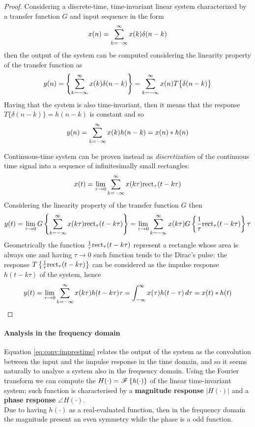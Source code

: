 	\begin{proof}
		Considering a discrete-time, time-invariant linear system characterized by a transfer function $G$ and input sequence in the form
		\[ x(n) = \sum_{k=-\infty}^\infty x(k) \delta(n-k) \]
		then the output of the system can be computed considering the linearity property of the transfer function as
		\[ y(n) = \left\{ \sum_{k=-\infty}^\infty x(k) \delta(n-k) \right\} = \sum_{k=-\infty}^\infty x(n) T\big\{ \delta(n-k) \big\} \]
		Having that the system is also time-invariant, then it means that the response $T\{\delta(n-k)\} = h(n-k)$ is constant and so 
		\[ y(n) = \sum_{k=-\infty}^\infty x(k) h(n-k) = x(n) * h(n) \]	
		
		Continuous-time system can be proven instead as \textit{discretization} of the continuous time signal into a sequence of infinitesimally small rectangles:
		\[ x(t) = \lim_{\tau\rightarrow0} \sum_{k=-\infty}^\infty x(k\tau) \textrm{rect}_\tau(t-k\tau) \]	
		Considering the linearity property of the transfer function $G$ then
		\[ y(t) = \lim_{\tau\rightarrow0} G\left\{ \sum_{k=-\infty}^\infty x(k\tau) \textrm{rect}_\tau(t-k\tau) \right\} = \lim_{\tau\rightarrow0} \sum_{k=-\infty}^\infty x(k\tau) G \left\{ \frac 1 \tau  \textrm{rect}_\tau(t-k\tau) \right\} \tau \]
		Geometrically the function $\frac 1 \tau \textrm{rect}_\tau(t-k\tau)$ represent a rectangle whose area is always one and having $\tau\rightarrow 0$ such function tends to the Dirac's pulse: the response $T\left\{ \frac 1 \tau \textrm{rect}_\tau(t-k\tau) \right\}$ can be considered as the impulse response $h(t-k\tau)$ of the system, hence
		\[ y(t) = \lim_{\tau\rightarrow 0} \sum_{k=-\infty}^\infty x(k\tau) h(t-k\tau)\tau = \int_{-\infty}^\infty x(\tau) h(t-\tau)\, d\tau = x(t) * h(t) \]
	\end{proof}

	\paragraph{Analysis in the frequency domain}  Equation \ref{eq:conv:imprestime} relates the output of the system as the convolution between the input and the impulse response in the time domain, and so it seems naturally to analyse a system also in the frequency domain. Using the Fourier transform we can compute the  $H(\cdot) = \mathscr{F}\left\{ h(\cdot) \right\}$ of the linear time-invariant system; such function is characterised by a \textbf{magnitude response} $|H(\cdot)|$ and a \textbf{phase response} $\angle H(\cdot)$. \\	
	Due to having $h(\cdot)$ as a real-evaluated function, then in the frequency domain the magnitude present an even symmetry while the phase is a odd function.
	
